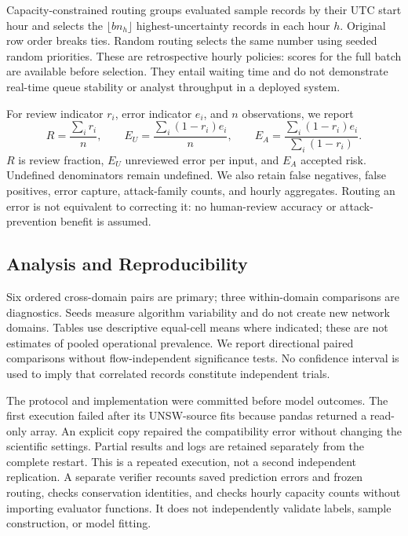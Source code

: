 \documentclass[manuscript,screen,nonacm]{acmart}
\begin{document}
Capacity-constrained routing groups evaluated sample records by their UTC start hour and selects the $\lfloor bn_h\rfloor$ highest-uncertainty records in each hour $h$. Original row order breaks ties. Random routing selects the same number using seeded random priorities. These are retrospective hourly policies: scores for the full batch are available before selection. They entail waiting time and do not demonstrate real-time queue stability or analyst throughput in a deployed system.

For review indicator $r_i$, error indicator $e_i$, and $n$ observations, we report
\begin{equation}
R=\frac{\sum_i r_i}{n},\qquad E_U=\frac{\sum_i(1-r_i)e_i}{n},\qquad E_A=\frac{\sum_i(1-r_i)e_i}{\sum_i(1-r_i)}.
\end{equation}
$R$ is review fraction, $E_U$ unreviewed error per input, and $E_A$ accepted risk. Undefined denominators remain undefined. We also retain false negatives, false positives, error capture, attack-family counts, and hourly aggregates. Routing an error is not equivalent to correcting it: no human-review accuracy or attack-prevention benefit is assumed.

\subsection{Analysis and Reproducibility}
Six ordered cross-domain pairs are primary; three within-domain comparisons are diagnostics. Seeds measure algorithm variability and do not create new network domains. Tables use descriptive equal-cell means where indicated; these are not estimates of pooled operational prevalence. We report directional paired comparisons without flow-independent significance tests. No confidence interval is used to imply that correlated records constitute independent trials.

The protocol and implementation were committed before model outcomes. The first execution failed after its UNSW-source fits because pandas returned a read-only array. An explicit copy repaired the compatibility error without changing the scientific settings. Partial results and logs are retained separately from the complete restart. This is a repeated execution, not a second independent replication. A separate verifier recounts saved prediction errors and frozen routing, checks conservation identities, and checks hourly capacity counts without importing evaluator functions. It does not independently validate labels, sample construction, or model fitting.
\end{document}
